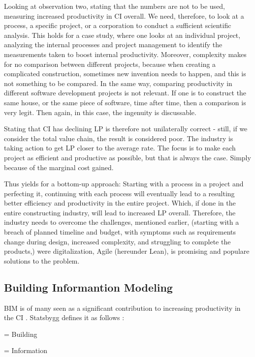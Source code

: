 Looking at observation two, stating that the numbers are not to be used, measuring increased productivity in CI overall. We need, therefore, to look at a process, a specific project, or a corporation to conduct a sufficient scientific analysis. This holds for a case study, where one looks at an individual project, analyzing the internal processes and project management to identify the measurements taken to boost internal productivity. Moreover, complexity makes for no comparison between different projects, because when creating a complicated construction, sometimes new invention needs to happen, and this is not something to be compared. In the same way, comparing productivity in different software development projects is not relevant. If one is to construct the same house, or the same piece of software, time after time, then a comparison is very legit. Then again, in this case, the ingenuity is discussable.

Stating that CI has declining LP is therefore not unilaterally correct - still, if we consider the total value chain, the result is considered poor. The industry is taking action to get LP closer to the average rate. The focus is to make each project as efficient and productive as possible, but that is always the case. Simply because of the marginal cost gained.

Thus yields for a bottom-up approach: Starting with a process in a project and perfecting it, continuing with each process will eventually lead to a resulting better efficiency and productivity in the entire project.  Which, if done in the entire constructing industry, will lead to increased LP overall. Therefore, the industry needs to overcome the challenges, mentioned earlier, (starting with a breach of planned timeline and budget, with symptoms such as requirements change during design, increased complexity, and struggling to complete the products,) were digitalization, Agile (hereunder Lean), is promising and populare solutions to the problem. 


\subsection{Building Informantion Modeling} \label{sec:bim}
BIM is of many seen as a significant contribution to increasing productivity in the CI \cite{frank_gehry, das2014bimcloud, chuang2011applying}. Statsbygg defines it as follows \cite{lean_i_praksis}:

 = Building

 = Information

